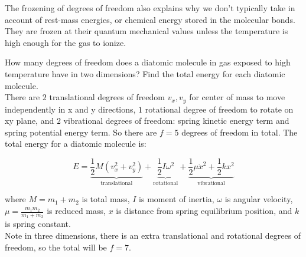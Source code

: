 The frozening of degrees of freedom also explains why we don't typically take in account of rest-mass energies, or chemical energy stored in the molecular bonds. They are frozen at their quantum mechanical values unless the temperature is high enough for the gas to ionize.

\begin{texample}
	How many degrees of freedom does a diatomic molecule in gas exposed to high temperature have in two dimensions? Find the total energy for each diatomic molecule. \\
	
	There are $2$ translational degrees of freedom $v_x,v_y$ for center of mass to move independently in x and y directions, $1$ rotational degree of freedom to rotate on xy plane, and $2$ vibrational degrees of freedom: spring kinetic energy term and spring potential energy term. So there are $f=5$ degrees of freedom in total. The total energy for a diatomic molecule is:
	
	$$E=\underbrace{\frac12M(v_x^2+v_y^2)}_{\text{translational}}+\underbrace{\frac12I\omega^2}_{\text{rotational}}+\underbrace{\frac12\mu \dot{x}^2+\frac12kx^2}_{\text{vibrational}}$$
	
	where $M=m_1+m_2$ is total mass, $I$ is moment of inertia, $\omega$ is angular velocity, $\mu=\frac{m_1m_2}{m_1+m_2}$ is reduced mass, $x$ is distance from spring equilibrium position, and $k$ is spring constant. \\
	
	Note in three dimensions, there is an extra translational and rotational degrees of freedom, so the total will be $f=7$.
\end{texample}

